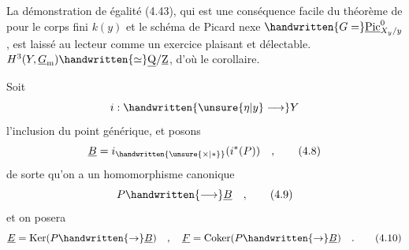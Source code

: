La démonstration de égalité (4.43), qui est une conséquence facile du
\reversemarginpar{}\normalmarginpar
théorème de   pour le corps fini $k(y)$ et le schéma de Picard nexe $\handwritten{G=}\underline{\mathrm{Pic}}^{0}_{X_{y}/y}$, est laissé au lecteur comme un exercice plaisant et délectable.
\clearpage
{}
$H^{3}(Y,\underline G_{\mathrm m})\handwritten{\simeq}\underline{\mathrm Q}/\underline{\mathrm Z}$, d'où le corollaire.

Soit 
\[
  i:\handwritten{\unsure{\eta|y}\longrightarrow}Y
\]
l'inclusion du point générique, et posons
\[
  \underline B=i_{\handwritten{\unsure{\times|\ast}}}(i^{*}(P)) \quad , \tag*{(4.8)}
\]
de sorte qu'on a un homomorphisme canonique
\[
  P\handwritten{\longrightarrow}\underline B \quad , \tag*{(4.9)}
\]
et on posera
\[
  \underline E=\operatorname{Ker}(P\handwritten{\to}\underline B)
  \quad ,\quad \underline F=\operatorname{Coker}(P\handwritten{\to}\underline B)\quad . \tag*{(4.10)}
\]

